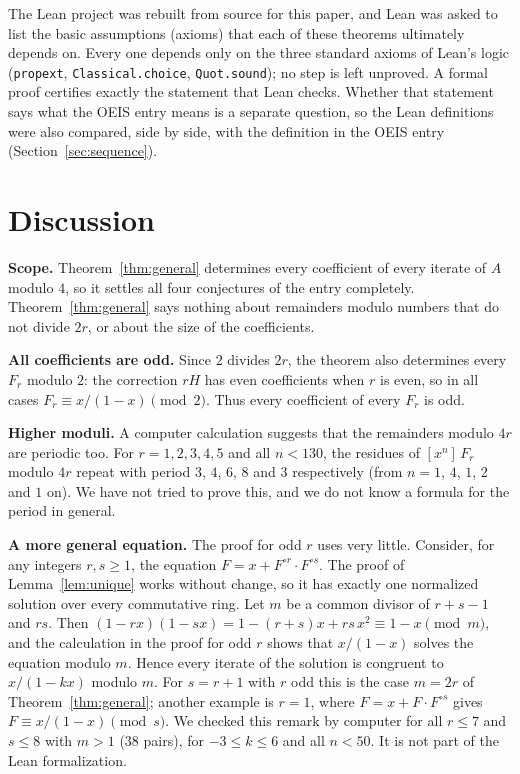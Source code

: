 \documentclass[11pt,a4paper]{article}
\theoremstyle{definition}
\theoremstyle{remark}
\newcommand{\coeff}[2]{[x^{#1}]\,#2}
\newcommand{\para}[1]{\par\medskip\noindent\textbf{#1}\enspace}
\begin{document}
The Lean project was rebuilt from source for this paper, and Lean was asked to list the basic assumptions (axioms)
that each of these theorems ultimately depends on. Every one depends only on the three standard axioms of Lean's logic
(\texttt{propext}, \texttt{Classical.choice}, \texttt{Quot.sound}); no step is left unproved. A formal proof certifies
exactly the statement that Lean checks. Whether that statement says what the OEIS entry means is a separate question,
so the Lean definitions were also compared, side by side, with the definition in the OEIS entry
(Section~\ref{sec:sequence}).

\section{Discussion}\label{sec:discussion}

\para{Scope.} Theorem~\ref{thm:general} determines every coefficient of every iterate of $A$ modulo $4$, so it
settles all four conjectures of the entry completely. Theorem~\ref{thm:general} says nothing about remainders modulo numbers that do
not divide $2r$, or about the size of the coefficients.

\para{All coefficients are odd.} Since $2$ divides $2r$, the theorem also determines every $F_r$ modulo $2$: the
correction $rH$ has even coefficients when $r$ is even, so in all cases $F_r\equiv x/(1-x)\pmod2$. Thus every
coefficient of every $F_r$ is odd.

\para{Higher moduli.} A computer calculation suggests that the remainders modulo $4r$ are periodic too. For $r=1,2,3,4,5$
and all $n<130$, the residues of $\coeff{n}{F_r}$ modulo $4r$ repeat with period $3$, $4$, $6$, $8$ and $3$
respectively (from $n=1$, $4$, $1$, $2$ and $1$ on). We have not tried to prove this, and we do not know a formula for
the period in general.

\para{A more general equation.} The proof for odd $r$ uses very little. Consider, for any integers $r,s\ge1$, the
equation $F=x+F^{\circ r}\cdot F^{\circ s}$. The proof of Lemma~\ref{lem:unique} works without change, so it has exactly
one normalized solution over every commutative ring. Let $m$ be a common divisor of $r+s-1$ and $rs$. Then
$(1-rx)(1-sx)=1-(r+s)x+rs\,x^2\equiv1-x\pmod m$, and the calculation in the proof for odd $r$ shows that
$x/(1-x)$ solves the equation modulo $m$. Hence every iterate of the solution is congruent to $x/(1-kx)$ modulo $m$.
For $s=r+1$ with $r$ odd this is the case $m=2r$ of Theorem~\ref{thm:general}; another example is $r=1$, where
$F=x+F\cdot F^{\circ s}$ gives $F\equiv x/(1-x)\pmod s$. We checked this remark by computer for all $r\le7$ and
$s\le8$ with $m>1$ ($38$ pairs), for $-3\le k\le6$ and all $n<50$. It is not part of the Lean formalization.
\end{document}
